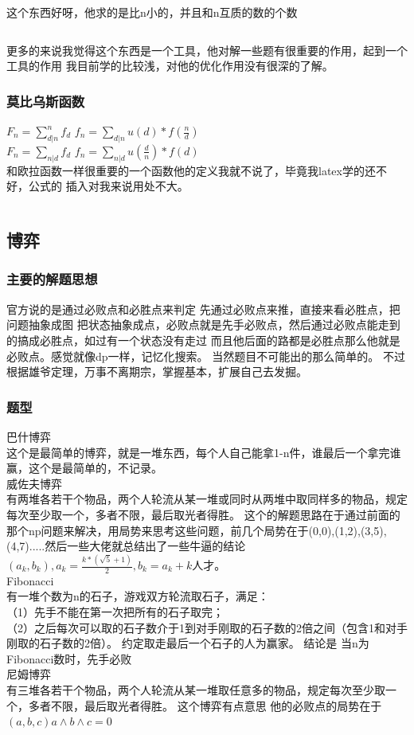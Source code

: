 \documentclass[a4paper,11pt]{article}
\begin{document}
\begin{CJK}{UTF8}{gbsn}
这个东西好呀，他求的是比n小的，并且和n互质的数的个数
\inputminted{c++}{../scoure/math/oula.cpp}
更多的来说我觉得这个东西是一个工具，他对解一些题有很重要的作用，起到一个工具的作用
我目前学的比较浅，对他的优化作用没有很深的了解。
\subsubsection{莫比乌斯函数}
$F_n = \sum_{d|n}^n f_d$
$f_n = \sum_{d|n} u(d)*f(\frac{n}{d})$\\
$F_n = \sum_{n|d} f_d$
$f_n = \sum_{n|d} u(\frac{d}{n})*f(d)$\\
和欧拉函数一样很重要的一个函数他的定义我就不说了，毕竟我latex学的还不好，公式的
插入对我来说用处不大。
\inputminted{c++}{../scoure/math/mobius.cpp}
\newpage
\subsection{博弈}
\subsubsection{主要的解题思想}
官方说的是通过必败点和必胜点来判定
先通过必败点来推，直接来看必胜点，把问题抽象成图 把状态抽象成点，必败点就是先手必败点，然后通过必败点能走到的搞成必胜点，如过有一个状态没有走过 而且他后面的路都是必胜点那么他就是必败点。感觉就像dp一样，记忆化搜索。
当然题目不可能出的那么简单的。
不过根据雄爷定理，万事不离期宗，掌握基本，扩展自己去发掘。
\subsubsection{题型}
巴什博弈\\
这个是最简单的博弈，就是一堆东西，每个人自己能拿1-n件，谁最后一个拿完谁赢，这个是最简单的，不记录。
\\威佐夫博弈\\
有两堆各若干个物品，两个人轮流从某一堆或同时从两堆中取同样多的物品，规定每次至少取一个，多者不限，最后取光者得胜。
这个的解题思路在于通过前面的那个np问题来解决，用局势来思考这些问题，前几个局势在于(0,0),(1,2),(3,5),(4,7).....然后一些大佬就总结出了一些牛逼的结论$( a_k,b_k),a_k=\frac{k*(\sqrt{5}+1)}{2} , b_k=a_k+k$人才。
\\Fibonacci\\
有一堆个数为n的石子，游戏双方轮流取石子，满足：
\\（1）先手不能在第一次把所有的石子取完；
\\（2）之后每次可以取的石子数介于1到对手刚取的石子数的2倍之间（包含1和对手刚取的石子数的2倍）。 约定取走最后一个石子的人为赢家。
结论是 当n为Fibonacci数时，先手必败
\\尼姆博弈\\
有三堆各若干个物品，两个人轮流从某一堆取任意多的物品，规定每次至少取一个，多者不限，最后取光者得胜。
这个博弈有点意思 他的必败点的局势在于$(a,b,c) a \land {b \land c} = 0$

\end{CJK}
\end{document}
